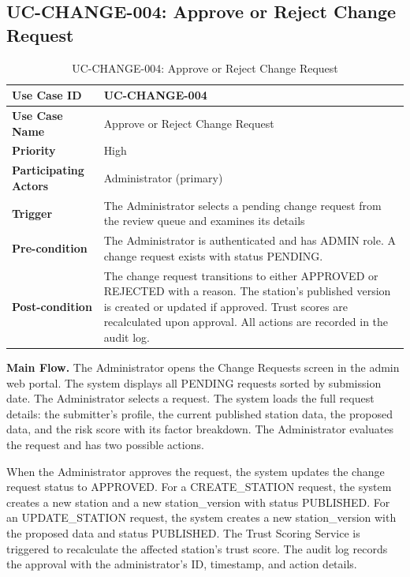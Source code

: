 \documentclass[../Main.tex]{subfiles}
\begin{document}
\subsection{UC-CHANGE-004: Approve or Reject Change Request}
\label{subsection:2.3.4}

\begin{table}[H]
\caption{UC-CHANGE-004: Approve or Reject Change Request}
\label{table:uc-change-004}
\begin{tabular}{|p{3.5cm}|p{12cm}|}
\hline
\textbf{Use Case ID} & UC-CHANGE-004 \\ \hline
\textbf{Use Case Name} & Approve or Reject Change Request \\ \hline
\textbf{Priority} & High \\ \hline
\textbf{Participating Actors} & Administrator (primary) \\ \hline
\textbf{Trigger} & The Administrator selects a pending change request from the review queue and examines its details \\ \hline
\textbf{Pre-condition} & The Administrator is authenticated and has ADMIN role. A change request exists with status PENDING. \\ \hline
\textbf{Post-condition} & The change request transitions to either APPROVED or REJECTED with a reason. The station's published version is created or updated if approved. Trust scores are recalculated upon approval. All actions are recorded in the audit log. \\ \hline
\end{tabular}
\end{table}

\textbf{Main Flow.} The Administrator opens the Change Requests screen in the admin web portal. The system displays all PENDING requests sorted by submission date. The Administrator selects a request. The system loads the full request details: the submitter's profile, the current published station data, the proposed data, and the risk score with its factor breakdown. The Administrator evaluates the request and has two possible actions.

When the Administrator approves the request, the system updates the change request status to APPROVED. For a CREATE_STATION request, the system creates a new station and a new station_version with status PUBLISHED. For an UPDATE_STATION request, the system creates a new station_version with the proposed data and status PUBLISHED. The Trust Scoring Service is triggered to recalculate the affected station's trust score. The audit log records the approval with the administrator's ID, timestamp, and action details.
\end{document}
